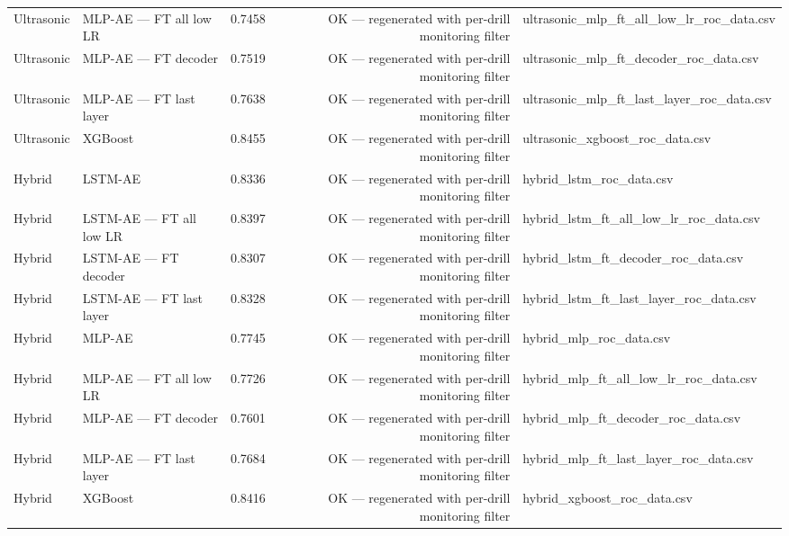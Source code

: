 \begin{tabular}{llrrl}
Ultrasonic & MLP-AE — FT all low LR & 0.7458 & OK — regenerated with per-drill monitoring filter & ultrasonic\_mlp\_ft\_all\_low\_lr\_roc\_data.csv \\
Ultrasonic & MLP-AE — FT decoder & 0.7519 & OK — regenerated with per-drill monitoring filter & ultrasonic\_mlp\_ft\_decoder\_roc\_data.csv \\
Ultrasonic & MLP-AE — FT last layer & 0.7638 & OK — regenerated with per-drill monitoring filter & ultrasonic\_mlp\_ft\_last\_layer\_roc\_data.csv \\
Ultrasonic & XGBoost & 0.8455 & OK — regenerated with per-drill monitoring filter & ultrasonic\_xgboost\_roc\_data.csv \\
Hybrid & LSTM-AE & 0.8336 & OK — regenerated with per-drill monitoring filter & hybrid\_lstm\_roc\_data.csv \\
Hybrid & LSTM-AE — FT all low LR & 0.8397 & OK — regenerated with per-drill monitoring filter & hybrid\_lstm\_ft\_all\_low\_lr\_roc\_data.csv \\
Hybrid & LSTM-AE — FT decoder & 0.8307 & OK — regenerated with per-drill monitoring filter & hybrid\_lstm\_ft\_decoder\_roc\_data.csv \\
Hybrid & LSTM-AE — FT last layer & 0.8328 & OK — regenerated with per-drill monitoring filter & hybrid\_lstm\_ft\_last\_layer\_roc\_data.csv \\
Hybrid & MLP-AE & 0.7745 & OK — regenerated with per-drill monitoring filter & hybrid\_mlp\_roc\_data.csv \\
Hybrid & MLP-AE — FT all low LR & 0.7726 & OK — regenerated with per-drill monitoring filter & hybrid\_mlp\_ft\_all\_low\_lr\_roc\_data.csv \\
Hybrid & MLP-AE — FT decoder & 0.7601 & OK — regenerated with per-drill monitoring filter & hybrid\_mlp\_ft\_decoder\_roc\_data.csv \\
Hybrid & MLP-AE — FT last layer & 0.7684 & OK — regenerated with per-drill monitoring filter & hybrid\_mlp\_ft\_last\_layer\_roc\_data.csv \\
Hybrid & XGBoost & 0.8416 & OK — regenerated with per-drill monitoring filter & hybrid\_xgboost\_roc\_data.csv \\
\bottomrule
\end{tabular}
